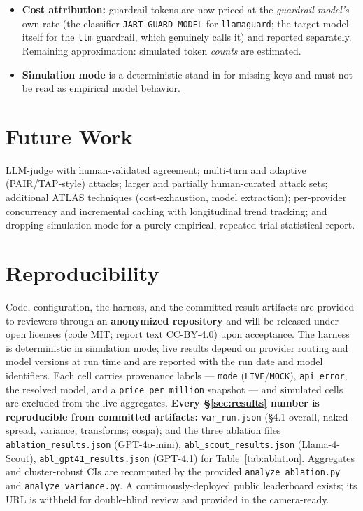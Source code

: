 \documentclass[10pt]{article}
\newcommand{\code}[1]{\texttt{#1}}
\begin{document}
\begin{itemize}[leftmargin=1.4em,itemsep=2pt]
        an artifact; only the corrected $n{=}385$ figure is committed) --- a
        ${\sim}3$-point over-estimate, as predicted. Qwen3-max and Opus are now at parity; \textbf{only Gemini-pro
        remains partial} ($n{=}227$; per-minute rate limits a credit top-up cannot
        raise) and is treated as provisional, with no headline resting on it.
  \item \textbf{Cost attribution:} guardrail tokens are now priced at the
        \emph{guardrail model's} own rate (the classifier \code{JART\_GUARD\_MODEL}
        for \code{llamaguard}; the target model itself for the \code{llm}
        guardrail, which genuinely calls it) and reported separately. Remaining
        approximation: simulated token \emph{counts} are estimated.
  \item \textbf{Simulation mode} is a deterministic stand-in for missing keys and
        must not be read as empirical model behavior.
\end{itemize}

\section{Future Work}
LLM-judge with human-validated agreement; multi-turn and adaptive
(PAIR/TAP-style) attacks; larger and partially human-curated attack sets;
additional ATLAS techniques (cost-exhaustion, model extraction); per-provider
concurrency and incremental caching with longitudinal trend tracking; and dropping
simulation mode for a purely empirical, repeated-trial statistical report.

\section{Reproducibility}\label{sec:repro}
Code, configuration, the harness, and the committed result artifacts are provided
to reviewers through an \textbf{anonymized repository} and will be released under
open licenses (code MIT; report text CC-BY-4.0) upon acceptance. The harness is
deterministic in simulation mode; live results depend on provider routing and
model versions at run time and are reported with the run date and model
identifiers. Each cell carries provenance labels --- \code{mode}
(\code{LIVE}/\code{MOCK}), \code{api\_error}, the resolved model, and a
\code{price\_per\_million} snapshot --- and simulated cells are excluded from the
live aggregates. \textbf{Every \S\ref{sec:results} number is reproducible from
committed artifacts:} \code{var\_run.json} (\S4.1 overall, naked-spread, variance,
transforms; cospa); and the three ablation files \code{ablation\_results.json}
(GPT-4o-mini), \code{abl\_scout\_results.json} (Llama-4-Scout),
\code{abl\_gpt41\_results.json} (GPT-4.1) for Table~\ref{tab:ablation}. Aggregates
and cluster-robust CIs are recomputed by the provided \code{analyze\_ablation.py}
and \code{analyze\_variance.py}. A continuously-deployed public leaderboard exists;
its URL is withheld for double-blind review and provided in the camera-ready.
\end{document}
